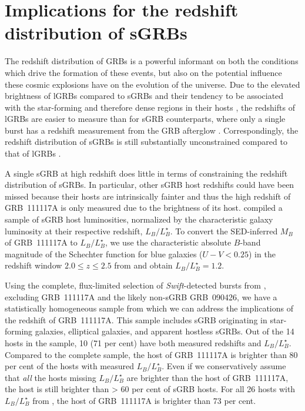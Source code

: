 \documentclass[referee]{aa}
\begin{document}
\section{Implications for the redshift distribution of sGRBs}


The redshift distribution of GRBs is a powerful informant on both the conditions
which drive the formation of these events, but also on the potential influence
these cosmic explosions have on the evolution of the universe. Due to the
elevated brightness of lGRBs compared to sGRBs \citep{Berger2014} and their
tendency to be associated with the star-forming and therefore dense regions in
their hosts \citep{Fruchter2006, Lyman2017}, the redshifts of lGRBs are easier
to measure than for sGRB counterparts, where only a single burst has a redshift
measurement from the GRB afterglow \citep{Cucchiara2013, DeUgartePostigo2014b}.
Correspondingly, the redshift distribution of sGRBs is still substantially
unconstrained compared to that of lGRBs \citep[e.g., see][]{Jakobsson2012a,
	DAvanzo2015, Perley2016d}.

A single sGRB at high redshift does little in terms of constraining the redshift
distribution of sGRBs. In particular, other sGRB host redshifts could have been
missed because their hosts are intrinsically fainter and thus the high redshift
of GRB~111117A is only measured due to the brightness of its host.
\citet{Berger2014} compiled a sample of sGRB host luminosities, normalized by
the characteristic galaxy luminosity at their respective redshift,
$L_B/L^{\star}_{B}$. To convert the SED-inferred $M_B$ of GRB~111117A to
$L_B/L^{\star}_{B}$, we use the characteristic absolute $B$-band magnitude of
the Schechter function for blue galaxies ($U - V < 0.25$) in the redshift window
$2.0 \leq z \leq 2.5$ from \citet{Marchesini2007} and obtain $L_B/L^{\star}_{B}
= 1.2$.

Using the complete, flux-limited selection of \textit{Swift}-detected bursts
from \citet{DAvanzo2014a}, excluding GRB~111117A and the likely non-sGRB
GRB~090426, we have a statistically homogeneous sample from which we can address
the implications of the redshift of GRB~111117A. This sample includes sGRB
originating in star-forming galaxies, elliptical galaxies, and apparent hostless
sGRBs. Out of the 14 hosts in the sample, 10 (71 per cent) have both measured
redshifts and $L_B/L^{\star}_{B}$. Compared to the complete sample, the host of
GRB~111117A  is brighter than 80 per cent of the hosts with measured
$L_B/L^{\star}_{B}$. Even if we conservatively assume that \textit{all} the
hosts missing $L_B/L^{\star}_{B}$ are brighter than the host of GRB~111117A, the
host is still brighter than > 60 per cent of sGRB hosts. For all 26 hosts with
$L_B/L^{\star}_{B}$ from \citet{Berger2014}, the host of GRB~111117A is brighter
than 73 per cent.
\end{document}
